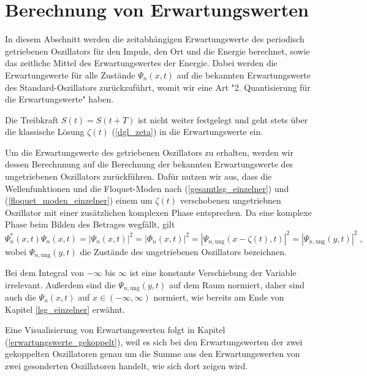 

\chapter{Berechnung von Erwartungswerten}
\label{3}
  In diesem Abschnitt werden die zeitabhängigen Erwartungswerte des periodisch getriebenen Oszillators für den Impuls, den Ort und die Energie berechnet, sowie das zeitliche Mittel des Erwartungswertes der Energie.
  Dabei werden die Erwartungswerte für alle Zustände $\Psi_n(x,t)$ auf die bekannten Erwartungswerte des Standard-Oszillators zurückzuführt, womit wir eine Art "2. Quantisierung für die Erwartungswerte" haben.

  Die Treibkraft $S(t)=S(t+T)$ ist nicht weiter festgelegt und geht stets über die klassische Lösung $\zeta(t)$ (\ref{dgl_zeta}) in die Erwartungswerte ein.

  Um die Erwartungswerte des getriebenen Oszillators zu erhalten, werden wir dessen Berechnnung auf die Berechnung der bekannten Erwartungswerte des ungetriebenen Oszillators zurückführen.
  Dafür nutzen wir aus, dass die Wellenfunktionen und die Floquet-Moden nach (\ref{gesamtlsg_einzelner}) und (\ref{floquet_moden_einzelner}) einem um $\zeta(t)$ verschobenen ungetriebnen Oszillator mit einer zusätzlichen komplexen Phase entsprechen.
  Da eine komplexe Phase beim Bilden des Betrages wegfällt, gilt
  \begin{equation}
    \Psi_n^*(x,t)\Psi_n(x,t) = |\Psi_n(x,t)|^2 = |\Phi_n(x,t)|^2 = |\Psi_{n,\text{ung}}(x-\zeta(t),t)|^2 = |\Psi_{n,\text{ung}}(y,t)|^2 \; ,
    \label{betrag_einzelner}
  \end{equation}
  wobei $\Psi_{n,\text{ung}}(y,t)$ die Zustände des ungetriebenen Oszillators bezeichnen.

  Bei dem Integral von $-\infty$ bis $\infty$ ist eine konstante Verschiebung der Variable irrelevant.
  Außerdem sind die $\Psi_{n,\text{ung}}(y,t)$ auf dem Raum normiert, daher sind auch die $\Psi_n(x,t)$ auf $x \in (-\infty,\infty)$ normiert, wie bereits am Ende von Kapitel \ref{lsg_einzelner} erwähnt.

  Eine Visualisierung von Erwartungswerten folgt in Kapitel (\ref{erwartungswerte_gekoppelt}), weil es sich bei den Erwartungswerten der zwei gekoppelten Oszillatoren genau um die Summe aus den Erwartungswerten von zwei gesonderten Oszillatoren handelt, wie sich dort zeigen wird.

